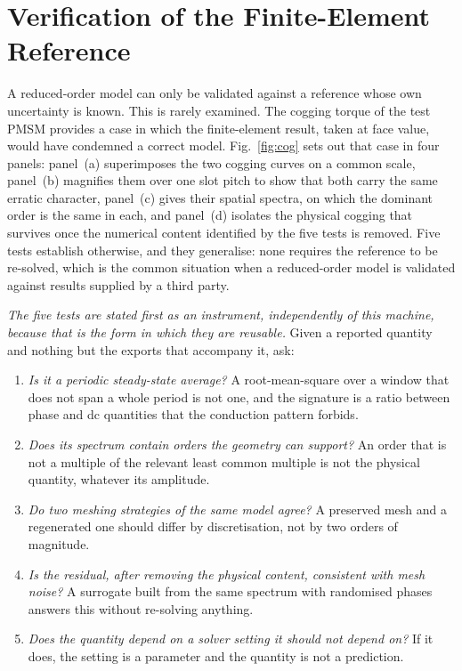 \documentclass[10pt,a4paper,twocolumn]{article}
\theoremstyle{plain}
\theoremstyle{remark}
\begin{document}

\section{Verification of the Finite-Element Reference}
\label{sec:audit}

A reduced-order model can only be validated against a reference whose
own uncertainty is known. This is rarely examined. The cogging torque of
the test PMSM provides a case in which the finite-element result, taken
at face value, would have condemned a correct model.
Fig.~\ref{fig:cog} sets out that case in four panels: panel~(a)
superimposes the two cogging curves on a common scale, panel~(b)
magnifies them over one slot pitch to show that both carry the same
erratic character, panel~(c) gives their spatial spectra, on which the
dominant order is the same in each, and panel~(d) isolates the physical
cogging that survives once the numerical content identified by the five
tests is removed. Five tests establish otherwise, and they generalise: none
requires the reference to be re-solved, which is the common situation
when a reduced-order model is validated against results supplied by a
third party.

\emph{The five tests are stated first as an instrument, independently of
this machine, because that is the form in which they are reusable.} Given
a reported quantity and nothing but the exports that accompany it, ask:

\begin{enumerate}[label=\textbf{T\arabic*.},leftmargin=*,itemsep=1pt]
\item \emph{Is it a periodic steady-state average?} A root-mean-square
over a window that does not span a whole period is not one, and the
signature is a ratio between phase and dc quantities that the conduction
pattern forbids.
\item \emph{Does its spectrum contain orders the geometry can support?}
An order that is not a multiple of the relevant least common multiple is
not the physical quantity, whatever its amplitude.
\item \emph{Do two meshing strategies of the same model agree?} A
preserved mesh and a regenerated one should differ by discretisation,
not by two orders of magnitude.
\item \emph{Is the residual, after removing the physical content,
consistent with mesh noise?} A surrogate built from the same spectrum
with randomised phases answers this without re-solving anything.
\item \emph{Does the quantity depend on a solver setting it should not
depend on?} If it does, the setting is a parameter and the quantity is
not a prediction.
\end{enumerate}
\end{document}
